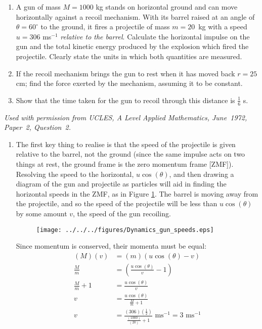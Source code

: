 
\begin{problem}[A1972AMIIQ2l] %
{\begin{enumerate}
	\item A gun of mass $M = 1000$ kg stands on horizontal ground and can move horizontally against a recoil mechanism. With its barrel raised at an angle of $\theta = 60^{\circ}$ to the ground, it fires a projectile of mass $m = 20$~kg with a speed $u = 306$ ms$^{-1}$ \emph{relative to the barrel}. Calculate the horizontal impulse on the gun and the total kinetic energy produced by the explosion which fired the projectile. Clearly state the units in which both quantities are measured.
	\item If the recoil mechanism brings the gun to rest when it has moved back $r = 25$ cm; find the force exerted by the mechanism, assuming it to be constant.
	\item Show that the time taken for the gun to recoil through this distance is $\frac{1}{6}$ s.
\end{enumerate}
}
{\textit{Used with permission from UCLES, A Level Applied Mathematics, June~1972, Paper~2, Question~2.}}
{\begin{enumerate}
	\item The first key thing to realise is that the speed of the projectile is given relative to the barrel, not the ground (since the same impulse acts on two things at rest, the ground frame is the zero momentum frame [ZMF]). Resolving the speed to the horizontal, $u \cos(\theta)$, and then drawing a diagram of the gun and projectile as particles will aid in finding the horizontal speeds in the ZMF, as in Figure \ref{fig:Dynamics_gun_speeds}. The barrel is moving away from the projectile, and so the speed of the projectile will be less than $u \cos(\theta)$ by some amount $v$, the speed of the gun recoiling.

\begin{figure}[h]
\centering
\texttt{[image: ../../../figures/Dynamics\_gun\_speeds.eps]}
\caption{}
\label{fig:Dynamics_gun_speeds}
\end{figure}

Since momentum is conserved, their momenta must be equal:
\begin{align*} 
(M)(v) &= (m)(u \cos (\theta) - v) \\  
\frac{M}{m} &= \left( \frac{u \cos(\theta)}{v} - 1 \right) \\  
\frac{M}{m} + 1 &= \frac{u \cos(\theta)}{v} \\ 
v &= \frac{u \cos(\theta)}{\frac{M}{m} + 1} \\ 
v &= \frac{(306)(\frac{1}{2})}{\frac{(1000)}{(20)} + 1} \text{ ms}^{-1} = 3 \text{ ms}^{-1}
 \end{align*}


\end{enumerate}}
\end{problem}
